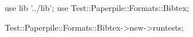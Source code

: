use lib '../lib';
use Test::Paperpile::Formats::Bibtex;

Test::Paperpile::Formats::Bibtex->new->runtests;
